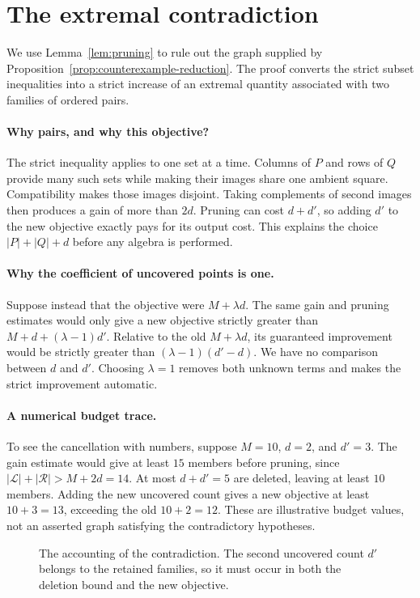 \section{The extremal contradiction}\label{sec:incompatibility}

We use Lemma~\ref{lem:pruning} to rule out the graph supplied by
Proposition~\ref{prop:counterexample-reduction}.  The proof converts the strict
subset inequalities into a strict increase of an extremal quantity associated
with two families of ordered pairs.


\paragraph{Why pairs, and why this objective?}
The strict inequality applies to one set at a time. Columns of $P$ and rows
of $Q$ provide many such sets while making their images share one ambient
square. Compatibility makes those images disjoint. Taking complements of
second images then produces a gain of more than $2d$. Pruning can cost
$d+d'$, so adding $d'$ to the new objective exactly pays for its output cost.
This explains the choice $|P|+|Q|+d$ before any algebra is performed.
\paragraph{Why the coefficient of uncovered points is one.}
Suppose instead that the objective were $M+\lambda d$. The same gain and
pruning estimates would only give a new objective strictly greater than
$M+d+(\lambda-1)d'$. Relative to the old $M+\lambda d$, its guaranteed
improvement would be strictly greater than $(\lambda-1)(d'-d)$. We have no
comparison between $d$ and $d'$. Choosing $\lambda=1$ removes both unknown
terms and makes the strict improvement automatic.

\paragraph{A numerical budget trace.}
To see the cancellation with numbers, suppose $M=10$, $d=2$, and $d'=3$.
The gain estimate would give at least $15$ members before pruning, since
$|\mathcal L|+|\mathcal R|>M+2d=14$. At most $d+d'=5$ are deleted,
leaving at least $10$ members. Adding the new uncovered count gives a new
objective at least $10+3=13$, exceeding the old $10+2=12$.
These are illustrative budget values, not an asserted graph satisfying
the contradictory hypotheses.

\begin{figure}[ht]\centering
\caption{The accounting of the contradiction. The second uncovered count $d'$ belongs to the retained families, so it must occur in both the deletion bound and the new objective.}
\end{figure}

